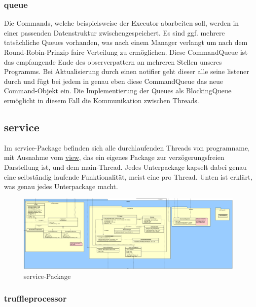       \subsubsection{queue}
      \label{subsubsec:queue}
      Die Commands, welche beispielsweise der Executor abarbeiten soll, werden in
      einer passenden Datenstruktur zwischengespeichert. Es sind ggf. mehrere
      tatsächliche Queues vorhanden, was nach einem Manager verlangt um nach dem
      Round-Robin-Prinzip faire Verteilung zu ermöglichen. Diese CommandQueue
      ist das empfangende Ende des \gls{observerpattern} an mehreren Stellen unseres
      Programms. Bei Aktualisierung durch einen \gls{notifier} geht dieser alle
      seine \gls{listener} durch und fügt bei jedem in genau eben diese
      CommandQueue das neue Command-Objekt ein. Die Implementierung der Queues
      als BlockingQueue ermöglicht in diesem Fall die Kommunikation zwischen Threads.

\subsection{service}
\label{subsec:service}

Im service-Package befinden sich alle durchlaufenden Threads von \gls{programname},
mit Ausnahme vom \hyperref[subsec:view]{view}, das ein eigenes Package zur verzögerungsfreien Darstellung ist, und dem
main-Thread. Jedes Unterpackage kapselt dabei genau eine selbständig laufende Funktionalität, meist eine pro Thread. Unten ist erklärt, was genau jedes Unterpackage macht.

\begin{figure}[H]
  \centering
  \includegraphics[width=\textwidth]{../diagramimages/service.png}
  \caption{service-Package}
  \medskip
\end{figure}

    \subsubsection{truffleprocessor}
    \label{subsubsec:truffleprocessor}

